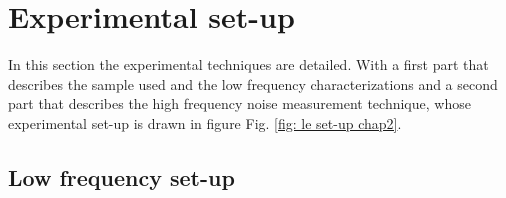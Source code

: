 \section{\texorpdfstring{Experimental set-up}{Experimental set-up} \label{sec: Experimental set-up chap2}}

In this section the experimental techniques are detailed.
With a first part that describes the sample used and the low frequency characterizations and a second part that describes the high frequency noise measurement technique, whose experimental set-up is drawn in figure Fig. \ref{fig: le set-up chap2}.

\subsection{Low frequency set-up}

